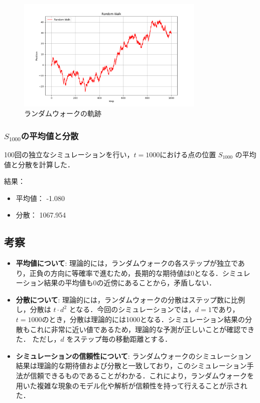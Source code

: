 \documentclass[fleqn, a4paper. 12pt]{jsarticle}
\begin{document}
    \begin{figure}[h]
    \centering
    \includegraphics[width=0.8\textwidth]{random_walk_plot.png}
    \caption{ランダムウォークの軌跡}
    \label{fig:4}
    \end{figure}
    
    \subsubsection*{$S_{1000}$の平均値と分散}
    100回の独立なシミュレーションを行い，$t = 1000$における点の位置 $S_{1000}$ の平均値と分散を計算した．
    
    結果：
    \begin{itemize}
        \item 平均値： -1.080
        \item 分散： 1067.954
    \end{itemize}
    
    \subsection*{考察}
    \begin{itemize}
        \item \textbf{平均値について}: 理論的には，ランダムウォークの各ステップが独立であり，正負の方向に等確率で進むため，長期的な期待値は0となる．シミュレーション結果の平均値も0の近傍にあることから，矛盾しない．
        \item \textbf{分散について}: 理論的には，ランダムウォークの分散はステップ数に比例し，分散は $t \cdot d^2$ となる．今回のシミュレーションでは，$d = 1$であり，$t = 1000$のとき，分散は理論的には1000となる．シミュレーション結果の分散もこれに非常に近い値であるため，理論的な予測が正しいことが確認できた．
        ただし，$d$ をステップ毎の移動距離とする．
        \item \textbf{シミュレーションの信頼性について}: ランダムウォークのシミュレーション結果は理論的な期待値および分散と一致しており，このシミュレーション手法が信頼できるものであることがわかる．これにより，ランダムウォークを用いた複雑な現象のモデル化や解析が信頼性を持って行えることが示された．
    \end{itemize}
    
\end{document}
